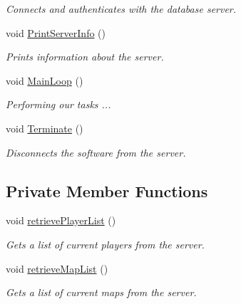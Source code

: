 \begin{DoxyCompactItemize}
\begin{DoxyCompactList}\small\item\em Connects and authenticates with the database server. \end{DoxyCompactList}\item 
\hypertarget{classManiaPP_a56d2774a29f21b3a164ae1f7ea6bd88b}{void \hyperlink{classManiaPP_a56d2774a29f21b3a164ae1f7ea6bd88b}{Print\-Server\-Info} ()}\label{classManiaPP_a56d2774a29f21b3a164ae1f7ea6bd88b}

\begin{DoxyCompactList}\small\item\em Prints information about the server. \end{DoxyCompactList}\item 
\hypertarget{classManiaPP_a8dff9e8e3835c3cac0df105a7bcce43c}{void \hyperlink{classManiaPP_a8dff9e8e3835c3cac0df105a7bcce43c}{Main\-Loop} ()}\label{classManiaPP_a8dff9e8e3835c3cac0df105a7bcce43c}

\begin{DoxyCompactList}\small\item\em Performing our tasks ... \end{DoxyCompactList}\item 
\hypertarget{classManiaPP_a87fd53fffe4a1840834a90ab575f5ce6}{void \hyperlink{classManiaPP_a87fd53fffe4a1840834a90ab575f5ce6}{Terminate} ()}\label{classManiaPP_a87fd53fffe4a1840834a90ab575f5ce6}

\begin{DoxyCompactList}\small\item\em Disconnects the software from the server. \end{DoxyCompactList}\end{DoxyCompactItemize}
\subsection*{Private Member Functions}
\begin{DoxyCompactItemize}
\item 
void \hyperlink{classManiaPP_aede94c0b982250de19186d447542e479}{retrieve\-Player\-List} ()
\begin{DoxyCompactList}\small\item\em Gets a list of current players from the server. \end{DoxyCompactList}\item 
void \hyperlink{classManiaPP_a18582fa28b259c22a8a8d526af62123a}{retrieve\-Map\-List} ()
\begin{DoxyCompactList}\small\item\em Gets a list of current maps from the server. \end{DoxyCompactList}\end{DoxyCompactItemize}

